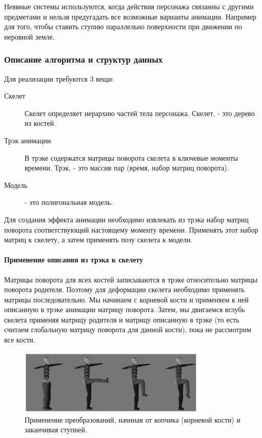 Неявные системы используются, когда действия персонажа связанны с другими предметами и нельзя предугадать все возможные варианты анимации.
Например для того, чтобы ставить ступню параллельно поверхности при движении по неровной земле.


\subsubsection{Описание алгоритма и структур данных}
Для реализации требуются 3 вещи: 
\begin{description}
\item[Скелет] Скелет определяет иерархию частей тела персонажа. 
Скелет, - это дерево из костей.

\item[Трэк анимации] В трэке содержатся матрицы поворота скелета в ключевые моменты времени.
Трэк, - это массив пар (время, набор матриц поворота).

\item[Модель]  - это полигональная модель.
\end{description}

Для создания эффекта анимации необходимо извлекать из трэка набор матриц поворота соответствующий настоящему моменту времени. Применять этот набор матриц к скелету, а затем применять позу скелета к модели.

\paragraph{Применение описания из трэка к скелету}
Матрицы поворота для всех костей записываются в трэке относительно матрицы поворота родителя.
Поэтому для деформации скелета необходимо применять матрицы последовательно.
Мы начинаем с корневой кости и применяем к ней описанную в трэке анимации матрицу поворота.
Затем, мы двигаемся вглубь скелета применяя матрицу родителя и матрицу описанную в трэке (то есть считаем глобальную матрицу поворота для данной кости), пока не рассмотрим все кости.

\begin{figure}[h!]
    \centering
    \includegraphics[width=0.8\textwidth]{forward_kinematics.png}
    \caption{\scriptsize{Применение преобразований, начиная от копчика (корневой кости) и заканчивая ступней.}}
\end{figure}

